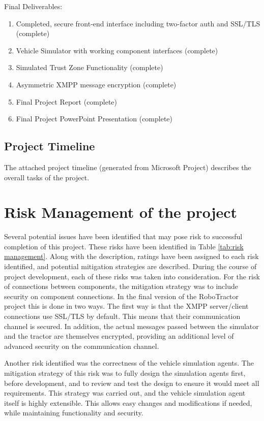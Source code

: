 \documentclass[conference,12pt]{IEEEtran}
\begin{document}
Final Deliverables:
\begin{enumerate}
\item Completed, secure front-end interface including two-factor auth and
    SSL/TLS (complete)
\item Vehicle Simulator with working component interfaces (complete)
\item Simulated Trust Zone Functionality (complete)
\item Asymmetric XMPP message encryption (complete)
\item Final Project Report (complete)
\item Final Project PowerPoint Presentation (complete)
\end{enumerate}

\subsection{Project Timeline}
The attached project timeline (generated from Microsoft Project) describes the
overall tasks of the project.

\section{Risk Management of the project}
Several potential issues have been identified that may pose risk to successful
completion of this project. These risks have been identified in Table
\ref{tab:risk management}. Along with the description, ratings have been assigned
to each risk identified, and potential mitigation strategies are described. During the course of project development, each of these risks was taken into consideration. For the risk of connections between components, the mitigation strategy was to include security on component connections. In the final version of the RoboTractor project this is done in two ways. The first way is that the XMPP server/client connections use SSL/TLS by default. This means that their communication channel is secured. In addition, the actual messages passed between the simulator and the tractor are themselves encrypted, providing an additional level of advanced security on the communication channel. 

Another risk identified was the correctness of the vehicle simulation agents. The mitigation strategy of this risk was to fully design the simulation agents first, before development, and to review and test the design to ensure it would meet all requirements. This strategy was carried out, and the vehicle simulation agent itself is highly extensible. This allows easy changes and modifications if needed, while maintaining functionality and security. 
\end{document}
